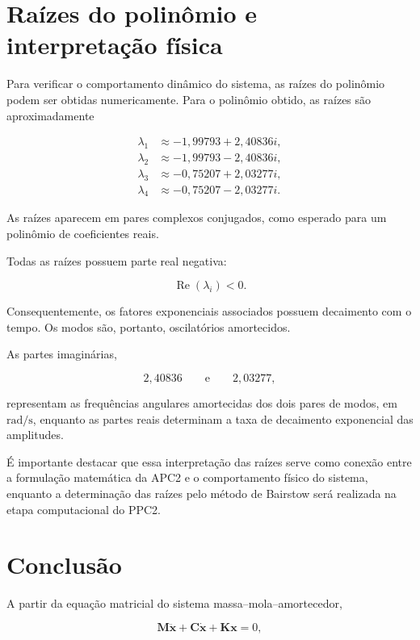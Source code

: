 \documentclass[12pt,a4paper]{article}
\begin{document}
\section{Raízes do polinômio e interpretação física}

Para verificar o comportamento dinâmico do sistema, as raízes do polinômio
podem ser obtidas numericamente. Para o polinômio obtido, as raízes são
aproximadamente

\begin{align}
\lambda_1 &\approx -1{,}99793+2{,}40836i,\\
\lambda_2 &\approx -1{,}99793-2{,}40836i,\\
\lambda_3 &\approx -0{,}75207+2{,}03277i,\\
\lambda_4 &\approx -0{,}75207-2{,}03277i.
\end{align}

As raízes aparecem em pares complexos conjugados, como esperado para um
polinômio de coeficientes reais.

Todas as raízes possuem parte real negativa:

\begin{equation}
\operatorname{Re}(\lambda_i)<0.
\end{equation}

Consequentemente, os fatores exponenciais associados possuem decaimento com
o tempo. Os modos são, portanto, oscilatórios amortecidos.

As partes imaginárias,

\begin{equation}
2{,}40836
\qquad\text{e}\qquad
2{,}03277,
\end{equation}

representam as frequências angulares amortecidas dos dois pares de modos, em
$\mathrm{rad/s}$, enquanto as partes reais determinam a taxa de decaimento
exponencial das amplitudes.

É importante destacar que essa interpretação das raízes serve como conexão
entre a formulação matemática da APC2 e o comportamento físico do sistema,
enquanto a determinação das raízes pelo método de Bairstow será realizada na
etapa computacional do PPC2.

\section{Conclusão}

A partir da equação matricial do sistema massa--mola--amortecedor,

\begin{equation}
\mathbf{M}\ddot{\mathbf{x}}
+
\mathbf{C}\dot{\mathbf{x}}
+
\mathbf{K}\mathbf{x}
=0,
\end{equation}
\end{document}
